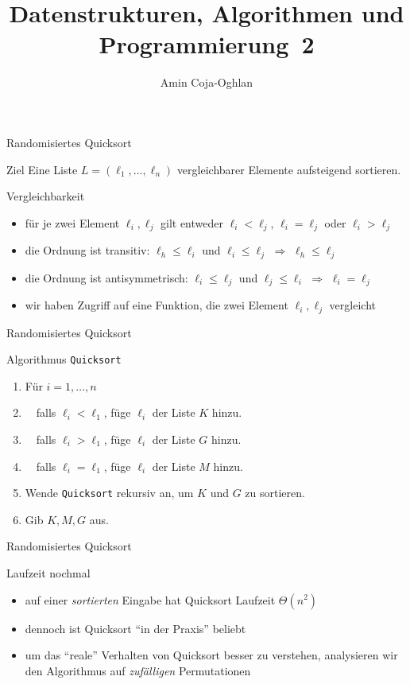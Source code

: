 \documentclass[aspectratio=1610, 11pt]{beamer}
\title{Datenstrukturen, Algorithmen und Programmierung~2}
\author[A.~Coja-Oghlan]{Amin Coja-Oghlan}
\institute[DAP2]{Lehrstuhl Informatik 2\\Fakult\"at f\"ur Informatik}
\begin{document}
\maketitle

\begin{frame}{Randomisiertes Quicksort}
	\begin{block}{Ziel}
			Eine Liste $L=(\ell_1,\ldots,\ell_n)$ \alert{vergleichbarer} Elemente aufsteigend sortieren.
	\end{block}
\begin{exampleblock}{Vergleichbarkeit}
	\begin{itemize}
		\item f\"ur je zwei Element $\ell_i,\ell_j$ gilt entweder $\ell_i<\ell_j$, $\ell_i=\ell_j$ oder $\ell_i>\ell_j$
		\item die Ordnung ist \alert{transitiv}: $\ell_h\leq\ell_i$ und $\ell_i\leq\ell_j$ $\Rightarrow$ $\ell_h\leq\ell_j$
	\item die Ordnung ist \alert{antisymmetrisch}: $\ell_i\leq\ell_j$ und $\ell_j\leq\ell_i$ $\Rightarrow$ $\ell_i=\ell_j$
	\item wir haben Zugriff auf eine Funktion, die zwei Element $\ell_i,\ell_j$ vergleicht
	\end{itemize}
	\end{exampleblock}
\end{frame}

\begin{frame}{Randomisiertes Quicksort}
\begin{exampleblock}{Algorithmus \tt Quicksort}
	\begin{enumerate}
		\item F\"ur $i=1,\ldots,n$
		\item $\quad$falls $\ell_i<\ell_1$, f\"uge $\ell_i$ der Liste $K$ hinzu.
		\item $\quad$falls $\ell_i>\ell_1$, f\"uge $\ell_i$ der Liste $G$ hinzu.
		\item $\quad$falls $\ell_i=\ell_1$, f\"uge $\ell_i$ der Liste $M$ hinzu.
		\item Wende {\tt Quicksort} rekursiv an, um $K$ und $G$ zu sortieren.
		\item Gib $K,M,G$ aus.
	\end{enumerate}
	\end{exampleblock}
\end{frame}

\begin{frame}{Randomisiertes Quicksort}
\begin{exampleblock}{Laufzeit nochmal}
	\begin{itemize}
		\item auf einer \emph{sortierten} Eingabe hat Quicksort Laufzeit $\Theta(n^2)$
		\item dennoch ist Quicksort ``in der Praxis'' beliebt
		\item um das ``reale'' Verhalten von Quicksort besser zu verstehen, analysieren wir den Algorithmus auf \emph{zuf\"alligen} Permutationen
	\end{itemize}
	\end{exampleblock}
\end{frame}
\end{document}
